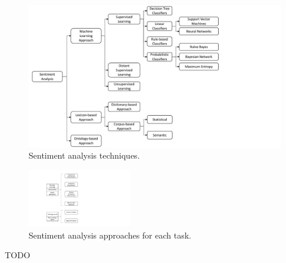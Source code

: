 \begin{figure}[!htp]
  \center
  \includegraphics[width=1\textwidth]{figures/sentiment_analysis_techniques}
  \caption{Sentiment analysis techniques\cite{medhat2014sentiment}.}
  \label{fig:sentiment_analysis_techniques}
\end{figure}

\begin{figure}[!htp]
  \center
  \includegraphics[width=0.4\textwidth]{figures/sentiment_analysis_approaches}
  \caption{Sentiment analysis approaches for each task.}
  \label{fig:sentiment_analysis_approaches}
\end{figure}

\cite{tripathy2016classification}
\cite{mullen2004sentiment}
\cite{pouransari2014deep}

TODO